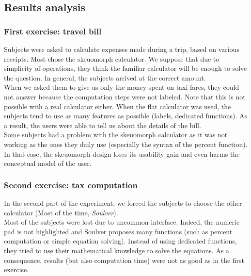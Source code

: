 \documentclass[a4paper,11pt] {article}
\theoremstyle{definition}
\begin{document}
    \subsection{Results analysis}

    \subsubsection{First exercise: travel bill}

    Subjects were asked to calculate expenses made during a trip, based on various receipts. Most chose the skeuomorph calculator. We suppose that due to simplicity of operations, they think the familiar calculator will be enough to solve the question. In general, the subjects arrived at the correct amount.\\

    When we asked them to give us only the money spent on taxi fares, they could not answer because the computation steps were not labeled. Note that this is not possible with a real calculator either. When the flat calculator was used, the subjects tend to use as many features as possible (labels, dedicated functions). As a result, the users were able to tell us about the details of the bill.\\

    Some subjects had a problem with the skeuomorph calculator as it was not working as the ones  they daily use (especially the syntax of the percent function). In that case, the skeuomorph design loses its usability gain and even harms the conceptual model of the user.\\

    \subsubsection{Second exercise: tax computation}

    In the second part of the experiment, we forced the subjects to choose the other calculator (Most of the time, \textit{Soulver}).\\

    Most of the subjects were lost due to uncommon interface. Indeed, the numeric pad is not highlighted and Soulver proposes many functions (such as percent computation or simple equation solving). Instead of using dedicated functions, they tried to use their mathematical knowledge to solve the equations. As a consequence, results (but also computation time) were not as good as in the first exercise.\\
\end{document}
